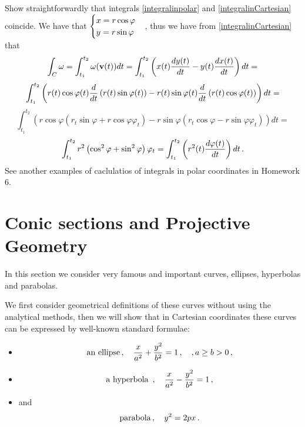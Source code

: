 \documentclass[12pt]{article}
\numberwithin{equation}{section}
\begin{document}
  Show straightforwardly that integrals 
\eqref{integralinpolar} 
and \eqref{integralinCartesian} coincide.
 We have that $\begin{cases}x=r\cos\varphi\cr y=r\sin\varphi\end{cases}$,
thus we have from \eqref{integralinCartesian} that 
                $$\int_C{\omega}=
\int_{t_1}^{t_2} {\omega}({\bf v}(t))dt=
\int_{t_1}^{t_2} \left(
          x(t){dy(t)\over dt}-
          y(t){dx(t)\over dt}
                      \right)dt=
               $$
               $$
 \int_{t_1}^{t_2} \left(
          r(t)\cos \varphi(t){d\over dt}
          \left(r(t)\sin\varphi(t)\right)
                    -
          r(t)\sin \varphi(t){d\over dt}\left(r(t)\cos\varphi(t)\right)
                      \right)dt=
                $$
                   $$
 \int_{t_1}^{t_2} \left(
          r\cos \varphi
          \left(r_t\sin\varphi+r\cos\varphi \varphi_t\right)
                    -
          r\sin \varphi\left(r_t\cos\varphi-r\sin\varphi\varphi_t\right)
                      \right)dt=
                $$ 
     $$
 \int_{t_1}^{t_2} r^2\left(
          \cos^2\varphi+\sin^2\varphi\right)\varphi_t=
\int_{t_1}^{t_2} \left(
          r^2(t){d\varphi(t)\over dt}
                      \right)dt\,.
        $$
See another examples of caclulatios of integrals in polar coordinates
in Homework 6. 




\section {Conic sections and Projective Geometry}


	In this section we consider very famous 
and important curves, ellipses, hyperbolas and parabolas.

  We first consider geometrical
definitions of these curves
without using the analytical methods, then
we will show that in Cartesian coordinates these curves
can be expressed by well-known standard formulae:

  \begin{itemize}
\item
       $$
\hbox {an ellipse}\,,\quad
{x\over a^2}+{y^2\over b^2}=1 \,,\quad , a\geq b>0\,,
       $$
\item     
  $$
   \hbox {a  hyperbola }\,,\quad
{x\over a^2}-{y^2\over b^2}=1 \,,
       $$
\item
and     $$
   \hbox {parabola}\,,\quad
       y^2=2px \,.
       $$
  \end{itemize}
\end{document}
